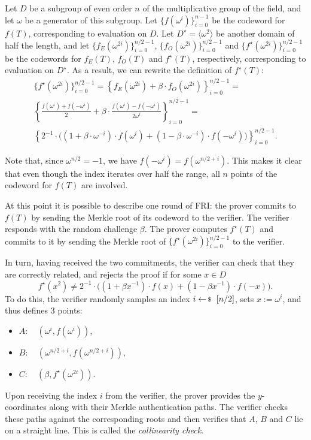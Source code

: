 \documentclass[../../book]{subfiles}
\begin{document}
Let $D$ be a subgroup of even order $n$ of the multiplicative group of the field, and let $\omega$ be a generator of this subgroup. Let $\{f(\omega^i)\}_{i=0}^{n-1}$ be the codeword for $f(T)$, corresponding to evaluation on $D$. Let $D^\star=\langle \omega^2\rangle$ be another domain of half the length, and let $\{f_E(\omega^{2i})\}_{i=0}^{n/2-1}$, $\{f_O(\omega^{2i})\}_{i=0}^{n/2-1}$ and $\{f^\star(\omega^{2i})\}_{i=0}^{n/2-1}$ be the codewords for $f_E(T)$, $f_O(T)$ and $f^\star(T)$, respectively, corresponding to evaluation on $D^\star$. As a result, we can rewrite the definition of $f^\star(T)$:
\begin{gather*}
  \{f^\star(\omega^{2i})\}_{i=0}^{n/2-1} = \left\{f_E(\omega^{2i})+\beta\cdot f_O(\omega^{2i})\right\}_{i=0}^{n/2-1} = \\
  \left\{\frac{f(\omega^i)+f(-\omega^i)}{2}+\beta \cdot\frac{f(\omega^i)-f(-\omega^i)}{2\omega^i}\right\}_{i=0}^{n/2-1} = \\
  \left\{2^{-1}\cdot \big((1+\beta\cdot \omega^{-i})\cdot f(\omega^i)+(1-\beta\cdot \omega^{-i})\cdot f(-\omega^i)\big)\right\}_{i=0}^{n/2-1}.
\end{gather*}

Note that, since $\omega^{n/2}=-1$, we have $f(-\omega^i)=f(\omega^{n/2+i})$. This makes it clear that even though the index iterates over half the range, all $n$ points of the codeword for $f(T)$ are involved.

At this point it is possible to describe one round of FRI: the prover commits to $f(T)$ by sending the Merkle root of its codeword to the verifier. The verifier responds with the random challenge $\beta$. The prover computes $f^\star(T)$ and commits to it by sending the Merkle root of $\{f^\star(\omega^{2i})\}_{i=0}^{n/2-1}$ to the verifier.

In turn, having received the two commitments, the verifier can check that they are correctly related, and rejects the proof if for some $x \in D$
\begin{equation}\label{eq:fri-fold}
  f^\star(x^2)\neq 2^{-1}\cdot \big((1+\beta x^{-1})\cdot f(x)+(1-\beta x^{-1})\cdot f(-x)\big).
\end{equation}
To do this, the verifier randomly samples an index $i \leftarrowS [n/2]$, sets $x := \omega^i$, and thus defines $3$ points:
\begin{itemize}
  \item $A:\quad (\omega^i, f(\omega^i))$,
  \item $B:\quad (\omega^{n/2+i}, f(\omega^{n/2+i}))$,
  \item $C:\quad (\beta, f^\star(\omega^{2i}))$.
\end{itemize}
Upon receiving the index $i$ from the verifier, the prover provides the $y$-coordinates along with their Merkle authentication paths. The verifier checks these paths against the corresponding roots and then verifies that $A$, $B$ and $C$ lie on a straight line. This is called the \emph{collinearity check}.
\end{document}
